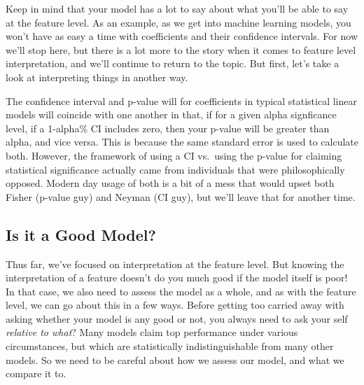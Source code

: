 \documentclass[
  letterpaper,
]{krantz}
\begin{document}
Keep in mind that your model has a lot to say about what you'll be able
to say at the feature level. As an example, as we get into machine
learning models, you won't have as easy a time with coefficients and
their confidence intervals. For now we'll stop here, but there is a lot
more to the story when it comes to feature level interpretation, and
we'll continue to return to the topic. But first, let's take a look at
interpreting things in another way.

\begin{tcolorbox}[enhanced jigsaw, toprule=.15mm, colback=white, breakable, rightrule=.15mm, arc=.35mm, bottomrule=.15mm, opacityback=0, colframe=quarto-callout-tip-color-frame, leftrule=.75mm, left=2mm]
\begin{minipage}[t]{5.5mm}
\textcolor{quarto-callout-tip-color}{\faLightbulb}
\end{minipage}%
\begin{minipage}[t]{\textwidth - 5.5mm}

The confidence interval and p-value will for coefficients in typical
statistical linear models will coincide with one another in that, if for
a given alpha signficance level, if a 1-alpha\% CI includes zero, then
your p-value will be greater than alpha, and vice versa. This is because
the same standard error is used to calculate both. However, the
framework of using a CI vs.~using the p-value for claiming statistical
significance actually came from individuals that were philosophically
opposed. Modern day usage of both is a bit of a mess that would upset
both Fisher (p-value guy) and Neyman (CI guy), but we'll leave that for
another time.

\end{minipage}%
\end{tcolorbox}

\subsection{Is it a Good Model?}\label{sec-lm-interpretation-model}

Thus far, we've focused on interpretation at the feature level. But
knowing the interpretation of a feature doesn't do you much good if the
model itself is poor! In that case, we also need to assess the model as
a whole, and as with the feature level, we can go about this in a few
ways. Before getting too carried away with asking whether your model is
any good or not, you always need to ask your self \emph{relative to
what}? Many models claim top performance under various circumstances,
but which are statistically indistinguishable from many other models. So
we need to be careful about how we assess our model, and what we compare
it to.
\end{document}

